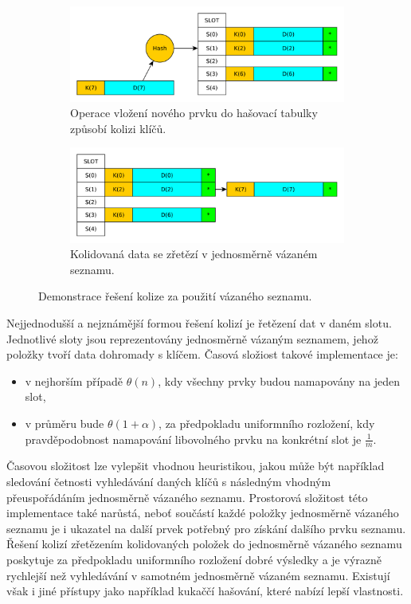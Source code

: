 \begin{figure}
	\centering
	\begin{subfigure}[b]{0.49\textwidth}
		\includegraphics[width=\textwidth]{fig/chained_hashing_insert}
		\caption{Operace vložení nového prvku do hašovací tabulky způsobí kolizi klíčů.}
	\end{subfigure}
	\begin{subfigure}[b]{0.49\textwidth}
		\includegraphics[width=\textwidth]{fig/chained_hashing_insert_result}
		\caption{Kolidovaná data se zřetězí v jednosměrně vázaném seznamu.}
	\end{subfigure}
	\caption{Demonstrace řešení kolize za použití vázaného seznamu.}
	\label{chained_hashing}
\end{figure}

Nejjednodušší a nejznámější formou řešení kolizí je řetězení dat v daném slotu. Jednotlivé 
sloty jsou reprezentovány jednosměrně vázaným seznamem, jehož položky tvoří data dohromady
s klíčem. Časová složiost takové implementace je:
\begin{itemize}
	\item v nejhorším případě $\theta (n)$, kdy všechny prvky budou namapovány
	na jeden slot,
	\item v průměru bude $\theta (1 + \alpha)$, za předpokladu
	uniformního rozložení, kdy pravděpodobnost namapování libovolného
	prvku na konkrétní slot je $\frac{1}{m}$.
\end{itemize}

Časovou složitost lze vylepšit vhodnou heuristikou, jakou může být například sledování
četnosti vyhledávání daných klíčů s následným vhodným přeuspořádáním jednosměrně vázaného
seznamu. Prostorová složitost této implementace také narůstá, neboť součástí každé položky jednosměrně
vázaného seznamu je i ukazatel na další prvek potřebný pro získání
dalšího prvku seznamu. Řešení kolizí zřetězením kolidovaných 
položek do jednosměrně vázaného seznamu poskytuje za předpokladu uniformního rozložení dobré
výsledky a je výrazně rychlejší než vyhledávání v samotném jednosměrně vázaném seznamu. Existují však i jiné
přístupy jako například kukaččí hašování, které nabízí lepší vlastnosti.

